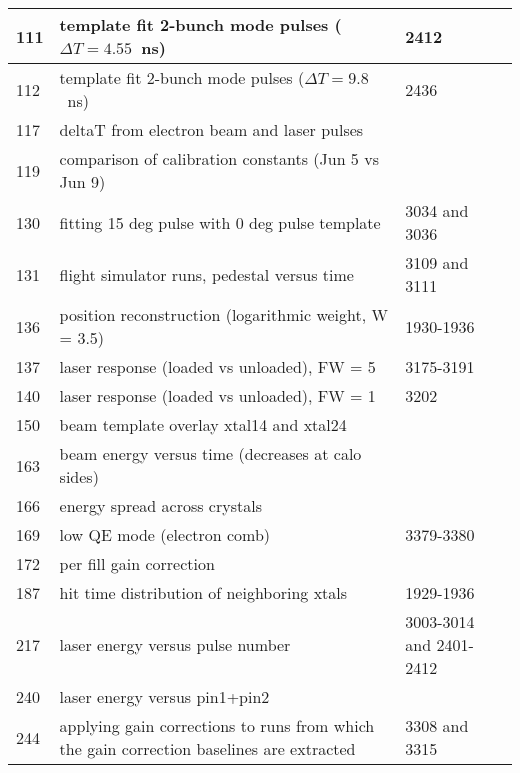 \begin{longtable}{|p{2.5cm}|p{8cm}|p{4cm}|}
111 & template fit 2-bunch mode pulses  ($\Delta T = 4.55$~ns) & 2412 \\ \hline
112 & template fit 2-bunch mode pulses  ($\Delta T = 9.8$~ns) & 2436 \\ \hline
117 & deltaT from electron beam and laser pulses & \\ \hline
119 & comparison of calibration constants (Jun 5 vs Jun 9) & \\ \hline
130 & fitting 15 deg pulse with 0 deg pulse template & 3034 and 3036 \\ \hline
131 & flight simulator runs, pedestal versus time & 3109 and 3111 \\ \hline
136 & position reconstruction (logarithmic weight, W = 3.5) & 1930-1936 \\ \hline
137 & laser response (loaded vs unloaded), FW = 5 & 3175-3191 \\ \hline
140 & laser response (loaded vs unloaded), FW = 1 & 3202 \\ \hline
150 & beam template overlay xtal14 and xtal24 & \\ \hline
163 & beam energy versus time (decreases at calo sides) & \\ \hline
166 & energy spread across crystals & \\ \hline
169 & low QE mode (electron comb) & 3379-3380 \\ \hline
172 & per fill gain correction &  \\ \hline
187 & hit time distribution of neighboring xtals & 1929-1936 \\ \hline
217 & laser energy versus pulse number & 3003-3014 and 2401-2412 \\ \hline
240 & laser energy versus pin1+pin2 & \\ \hline
244 & applying gain corrections to runs from which the gain correction baselines are extracted & 3308 and 3315 \\ \hline
\end{longtable}
